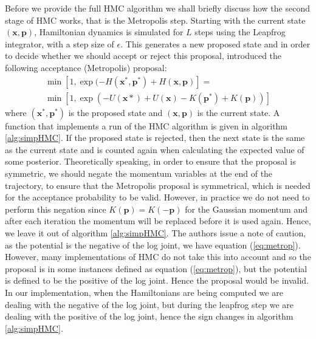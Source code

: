 Before we provide the full HMC algorithm we shall briefly discuss how the second stage of HMC works, that is the Metropolis step. Starting with the current state $(\textbf{x},\textbf{p})$, Hamiltonian dynamics is simulated for $L$ steps using the Leapfrog integrator, with a step size of $\epsilon$. This generates a new proposed state and in order to decide whether we should accept or reject this proposal, \citep{duane1987hybrid} introduced the following acceptance (Metropolis) proposal:
\begin{multline}
\label{eq:metrop}
\min[1, \exp(-H(\textbf{x}^{*}, \textbf{p}^{*}) + H(\textbf{x}, \textbf{p})] =\\
\min[1, \exp(-U(\textbf{x}{*}) + U(\textbf{x}) - K(\textbf{p}^{*}) + K(\textbf{p}))]
\end{multline}where $ (\textbf{x}^{*}, \textbf{p}^{*})$ is the proposed state and $(\textbf{x}, \textbf{p})$ is the current state. A function that implements a run of the HMC algorithm is given in algorithm \ref{alg:simpHMC}. If the proposed state is rejected, then the next state is the same as the current state and is counted again when calculating the expected value of some posterior. 
Theoretically speaking, in order to ensure that the proposal is symmetric, we should negate the momentum variables at the end of the trajectory, to ensure that the Metropolis proposal is symmetrical, which is needed for the acceptance probability to be valid. However, in practice we do not need to perform this negation since $K(\textbf{p}) = K(-\textbf{p})$ for the Gaussian momentum and after each iteration the momentum will be replaced before it is used again. Hence, we leave it out of algorithm \ref{alg:simpHMC}. The authors issue a note of caution, as the potential is the negative of the log joint, we have equation (\ref{eq:metrop}). However, many implementations of HMC do not take this into account and so the proposal is in some instances defined as equation (\ref{eq:metrop}), but the potential is defined to be the positive of the log joint. Hence the proposal would be invalid. In our implementation, when the Hamiltonians are being computed we are dealing with the negative of the log joint, but during the leapfrog step we are dealing with the positive of the log joint, hence the sign changes in algorithm \ref{alg:simpHMC}.  
